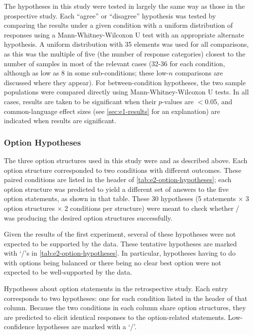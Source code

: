 The hypotheses in this study were tested in largely the same way as those in the prospective study.
%
Each ``agree'' or ``disagree'' hypothesis was tested by comparing the results under a given condition with a uniform distribution of responses using a Mann-Whitney-Wilcoxon U test with an appropriate alternate hypothesis.
%
A uniform distribution with 35 elements was used for all comparisons, as this was the multiple of five (the number of response categories) closest to the number of samples in most of the relevant cases (32-36 for each condition, although as low as 8 in some sub-conditions; these low-$n$ comparisons are discussed where they appear).
%
For between-condition hypotheses, the two sample populations were compared directly using Mann-Whitney-Wilcoxon U tests.
%
In all cases, results are taken to be significant when their $p$-values are $<$0.05, and common-language effect sizes (see \cref{sec:e1-results} for an explanation) are indicated when results are significant.

\subsubsection{Option Hypotheses}

The three option structures used in this study were   and \obv{,} as described above.
%
Each option structure corresponded to two conditions with different outcomes.
%
These paired conditions are listed in the header of \cref{tab:e2-option-hypotheses}; each option structure was predicted to yield a different set of answers to the five option statements, as shown in that table.
%
These 30 hypotheses (5 statements $\times$ 3 option structures $\times$ 2 conditions per structure) were meant to check whether \dunyazad/ was producing the desired option structures successfully.


Given the results of the first experiment, several of these hypotheses were not expected to be supported by the data.
%
These tentative hypotheses are marked with `\lc/'s in \cref{tab:e2-option-hypotheses}.
%
In particular, hypotheses having to do with options being balanced or there being no clear best option were not expected to be well-supported by the data.

\begin{table}[!h]
\centering
\bgroup
\def\arraystretch{1.3}
\setlength{\tabcolsep}{0.6em}

\egroup
\caption[Retrospective option hypotheses]{Hypotheses about option statements in the retrospective study. Each entry corresponds to two hypotheses: one for each condition listed in the header of that column. Because the two conditions in each column share option structures, they are predicted to elicit identical responses to the option-related statements. Low-confidence hypotheses are marked with a `\lc/'.}
  \label{tab:e2-option-hypotheses}
\end{table}


